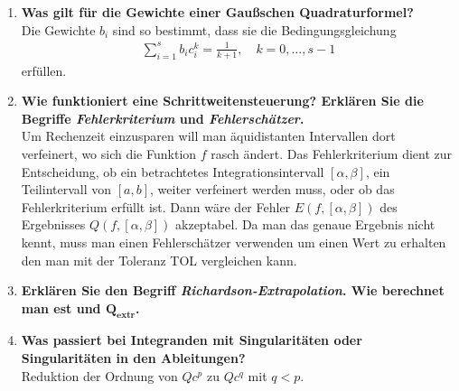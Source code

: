 \begin{enumerate}
		\item \textbf{Was gilt für die Gewichte einer Gaußschen Quadraturformel?} \\
			Die Gewichte \(b_i\) sind so bestimmt, dass sie die Bedingungsgleichung
			\begin{align*}
				\sum_{i=1}^{s}b_ic_i^k=\frac{1}{k+1}, \quad k=0,\dots,s-1
			\end{align*}
			erfüllen.
		\item \textbf{Wie funktioniert eine Schrittweitensteuerung? Erklären Sie die Begriffe \textit{Fehlerkriterium} und \textit{Fehlerschätzer}.} \\
			Um Rechenzeit einzusparen will man äquidistanten Intervallen dort verfeinert, wo sich die Funktion \(f\) rasch ändert.
			Das Fehlerkriterium dient zur Entscheidung, ob ein betrachtetes Integrationsintervall \([\alpha, \beta]\), ein Teilintervall von \([a,b]\), weiter verfeinert werden muss, oder ob das Fehlerkriterium erfüllt ist. Dann wäre der Fehler \(E(f,[\alpha,\beta])\) des Ergebnisses \(Q(f,[\alpha,\beta])\) akzeptabel.
			Da man das genaue Ergebnis nicht kennt, muss man einen Fehlerschätzer verwenden um einen Wert zu erhalten den man mit der Toleranz TOL vergleichen kann.
		
		
		\item \textbf{Erklären Sie den Begriff \textit{Richardson-Extrapolation}. Wie berechnet man est und $\mathbf{Q_{extr}}$.} \\
			
		
		\item \textbf{Was passiert bei Integranden mit Singularitäten oder Singularitäten in den Ableitungen?} \\
			Reduktion der Ordnung von \(Qc^p\) zu \(Qc^q\) mit \(q<p\).
		

\end{enumerate}
